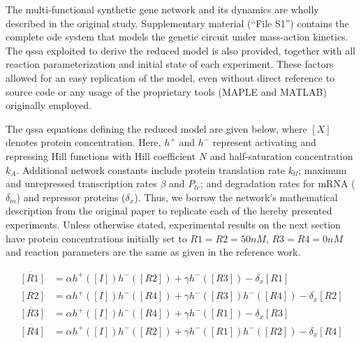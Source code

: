   The multi-functional synthetic gene network and its dynamics are wholly described in the original study.
  Supplementary material (``File S1'') contains the complete \ac{ode} system that models the genetic circuit under mass-action kinetics.
  The \ac{qssa} exploited to derive the reduced model is also provided, together with all reaction parameterization and initial state of each experiment.
  These factors allowed for an easy replication of the model, even without direct reference to source code or any usage of the proprietary tools (MAPLE and MATLAB) originally employed.

  The \ac{qssa} equations defining the reduced model are given below, where $[X]$ denotes protein concentration.
  Here, $h^+$ and $h^-$ represent activating and repressing Hill functions with Hill coefficient $N$ and half-saturation concentration $k_A$.
  Additional network constants include protein translation rate $k_{tl}$; maximum and unrepressed transcription rates $\beta$ and $P_{tc}$; and degradation rates for mRNA ($\delta_m$) and repressor proteins ($\delta_x$).
  Thus, we borrow the network's mathematical description from the original paper to replicate each of the hereby presented experiments.
  Unless otherwise stated, experimental results on the next section have protein concentrations initially set to $R1 = R2 = 50nM$, $R3 = R4 = 0nM$ and reaction parameters are the same as given in the reference work.

  \begin{equation*}\label{eq:qssa}
    \begin{aligned}
      \dot{[R1]} &= \alpha h^+([I]) h^-([R2]) + \gamma h^-([R3])           - \delta_x [R1] \\
      \dot{[R2]} &= \alpha h^+([I]) h^-([R4]) + \gamma h^-([R3]) h^-([R4]) - \delta_x [R2] \\
      \dot{[R3]} &= \alpha h^+([I]) h^-([R4]) + \gamma h^-([R1])           - \delta_x [R3] \\
      \dot{[R4]} &= \alpha h^+([I]) h^-([R2]) + \gamma h^-([R1]) h^-([R2]) - \delta_x [R4] \\
    \end{aligned}
  \end{equation*}

